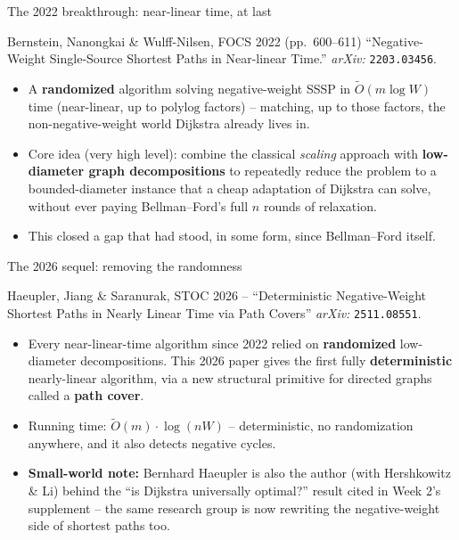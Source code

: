 \documentclass[11pt,aspectratio=169]{beamer}
\begin{document}
\begin{frame}{The 2022 breakthrough: near-linear time, at last}
  \begin{block}{Bernstein, Nanongkai \& Wulff-Nilsen, FOCS 2022 (pp.\ 600--611)}
    ``Negative-Weight Single-Source Shortest Paths in Near-linear Time.''
    \emph{arXiv:} \texttt{2203.03456}.
  \end{block}
  \begin{itemize}
    \item A \textbf{randomized} algorithm solving negative-weight SSSP in
    $\widetilde{O}(m\log W)$ time (near-linear, up to $\mathrm{polylog}$ factors) --
    matching, up to those factors, the non-negative-weight world Dijkstra already lives
    in.
    \item Core idea (very high level): combine the classical \emph{scaling} approach
    with \textbf{low-diameter graph decompositions} to repeatedly reduce the problem to
    a bounded-diameter instance that a cheap adaptation of Dijkstra can solve, without
    ever paying Bellman--Ford's full $n$ rounds of relaxation.
    \item This closed a gap that had stood, in some form, since Bellman--Ford itself.
  \end{itemize}
\end{frame}

\begin{frame}{The 2026 sequel: removing the randomness}
  \begin{block}{Haeupler, Jiang \& Saranurak, STOC 2026 -- ``Deterministic Negative-Weight
  Shortest Paths in Nearly Linear Time via Path Covers''}
    \emph{arXiv:} \texttt{2511.08551}.
  \end{block}
  \begin{itemize}
    \item Every near-linear-time algorithm since 2022 relied on \textbf{randomized}
    low-diameter decompositions. This 2026 paper gives the first fully
    \textbf{deterministic} nearly-linear algorithm, via a new structural primitive for
    directed graphs called a \textbf{path cover}.
    \item Running time: $\widetilde{O}(m)\cdot\log(nW)$ -- deterministic, no
    randomization anywhere, and it also detects negative cycles.
    \item \textbf{Small-world note:} Bernhard Haeupler is also the author (with
    Hershkowitz \& Li) behind the ``is Dijkstra universally optimal?'' result cited in
    Week 2's supplement -- the same research group is now rewriting the negative-weight
    side of shortest paths too.
  \end{itemize}
\end{frame}
\end{document}

